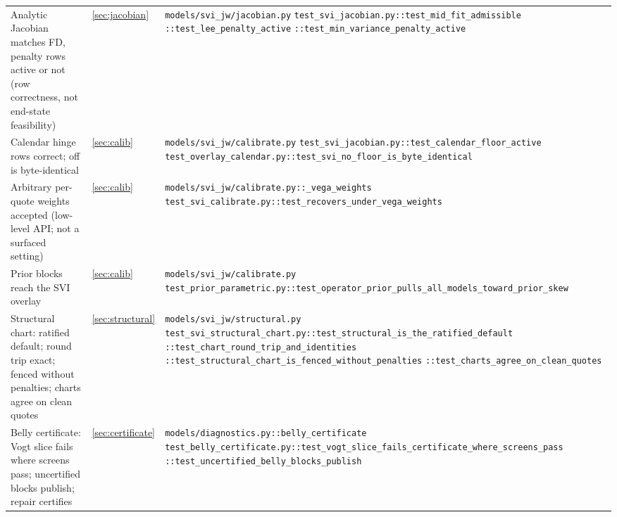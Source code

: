 \documentclass[11pt]{article}
\begin{document}
\begin{longtable}{@{}p{}p{}p{}@{}}
\addlinespace
Analytic Jacobian matches FD, penalty rows active or not (row
correctness, not end-state feasibility) &
\cref{sec:jacobian} &
\nolinkurl{models/svi_jw/jacobian.py}\newline
\nolinkurl{test_svi_jacobian.py::test_mid_fit_admissible}\newline
\nolinkurl{::test_lee_penalty_active}\newline
\nolinkurl{::test_min_variance_penalty_active}\\
\addlinespace
Calendar hinge rows correct; off is byte-identical &
\cref{sec:calib} &
\nolinkurl{models/svi_jw/calibrate.py}\newline
\nolinkurl{test_svi_jacobian.py::test_calendar_floor_active}\newline
\nolinkurl{test_overlay_calendar.py::test_svi_no_floor_is_byte_identical}\\
\addlinespace
Arbitrary per-quote weights accepted (low-level API; not a surfaced
setting) &
\cref{sec:calib} &
\nolinkurl{models/svi_jw/calibrate.py::_vega_weights}\newline
\nolinkurl{test_svi_calibrate.py::test_recovers_under_vega_weights}\\
\addlinespace
Prior blocks reach the SVI overlay &
\cref{sec:calib} &
\nolinkurl{models/svi_jw/calibrate.py}\newline
\nolinkurl{test_prior_parametric.py::test_operator_prior_pulls_all_models_toward_prior_skew}\\
\addlinespace
Structural chart: ratified default; round trip exact; fenced without
penalties; charts agree on clean quotes &
\cref{sec:structural} &
\nolinkurl{models/svi_jw/structural.py}\newline
\nolinkurl{test_svi_structural_chart.py::test_structural_is_the_ratified_default}\newline
\nolinkurl{::test_chart_round_trip_and_identities}\newline
\nolinkurl{::test_structural_chart_is_fenced_without_penalties}\newline
\nolinkurl{::test_charts_agree_on_clean_quotes}\\
\addlinespace
Belly certificate: Vogt slice fails where screens pass; uncertified blocks
publish; repair certifies &
\cref{sec:certificate} &
\nolinkurl{models/diagnostics.py::belly_certificate}\newline
\nolinkurl{test_belly_certificate.py::test_vogt_slice_fails_certificate_where_screens_pass}\newline
\nolinkurl{::test_uncertified_belly_blocks_publish}\newline

\end{longtable}
\end{document}
